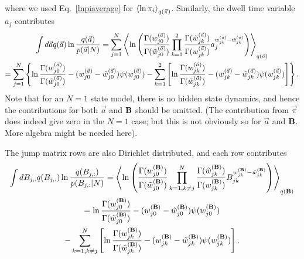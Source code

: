 where we used Eq.~\eqref{lnpiaverage} for
$\left\langle \ln \pi_i\right\rangle_{q(\vec{\pi})}$. Similarly, the dwell time variable
$a_j$ contributes
\begin{multline}
  \int d\vec{ a} q(\vec{ a}) \ln\frac{q(\vec{ a})}{p(\vec{ a}|N)}
  =\sum_{j=1}^N
  \left\langle \ln\left(\frac{\Gamma(w_{j0}^{(\vec{ a})})}{\Gamma(\tilde w_{j0}^{(\vec{ a})})}
    \prod_{k=1}^2\frac{\Gamma(\tilde w_{jk}^{(\vec{ a})})}{\Gamma(w_{jk}^{(\vec{ a})})}
     a_j^{w_{jk}^{(\vec{ a})}-\tilde w_{jk}^{(\vec{ a})}}\right)\right\rangle_{q(\vec{ a})}\\
  =\sum_{j=1}^N\left\{
  \ln\frac{\Gamma(w_{j0}^{(\vec{ a})})}{\Gamma(\tilde w_{j0}^{(\vec{ a})})}
  -(w_{j0}^{(\vec a)}-\tilde w_{j0}^{(\vec a)})\psi(w_{j0}^{(\vec{ a})})
  -\sum_{k=1}^2\left[\ln\frac{\Gamma(w_{jk}^{(\vec{ a})})}{\Gamma(\tilde w_{jk}^{(\vec{ a})})}
    -(w_{jk}^{(\vec{ a})}-\tilde w_{jk}^{(\vec{ a})})\psi(w_{jk}^{(\vec{ a})})\right]\right\}.
\end{multline}
Note that for an $N=1$ state model, there is no hidden state dynamics,
and hence the contributions for both $\vec{a}$ and $\mathbf{B}$ should
be omitted. (The contribution from $\vec{\pi}$ does indeed give zero
in the $N=1$ case; but this is not obviously so for $\vec{a}$ and
$\mathbf{B}$. More algebra might be needed here).

The jump matrix rows are also Dirichlet distributed, and each row
contributes
\begin{multline}
  \int dB_{j,:} q(B_{j,:}) \ln\frac{q(B_{j,:})}{p(B_{j,:}|N)}
  =\left\langle \ln\left(\frac{\Gamma(w_{j0}^{(\mathbf{B})})}{\Gamma(\tilde w_{j0}^{(\mathbf{B})})}
    \prod_{k=1,k\ne j}^N\frac{\Gamma(\tilde w_{jk}^{(\mathbf{B})})}{\Gamma(w_{jk}^{(\mathbf{B})})}
    B_{jk}^{w_{jk}^{(\mathbf{B})}-\tilde w_{jk}^{(\mathbf{B})}}\right)\right\rangle_{q(\mathbf{B})}\\
  =\ln\frac{\Gamma(w_{j0}^{(\mathbf{B})})}{\Gamma(\tilde w_{j0}^{(\mathbf{B})})}
  -(w_{j0}^{(\mathbf{B})}-\tilde w_{j0}^{(\mathbf{B})})\psi(w_{j0}^{(\mathbf{B})})\\
  -\sum_{k=1,k\ne j}^N\left[\ln\frac{\Gamma(w_{jk}^{(\mathbf{B})})}{\Gamma(\tilde w_{jk}^{(\mathbf{B})})}
    -(w_{jk}^{(\mathbf{B})}-\tilde w_{jk}^{(\mathbf{B})})\psi(w_{jk}^{(\mathbf{B})})
\right].
\end{multline}

